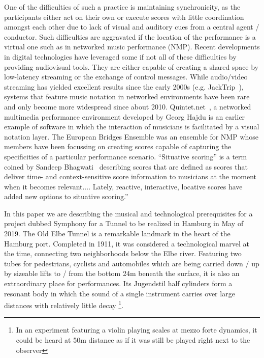 One of the difficulties of such a practice is maintaining synchronicity, as the participants either act on their own or execute scores with little coordination amongst each other due to lack of visual and auditory cues from a central agent / conductor. Such difficulties are aggravated if the location of the performance is a virtual one such as in networked music performance (NMP). Recent developments in digital technologies have leveraged some if not all of these difficulties by providing audiovisual tools. They are either capable of creating a shared space by low-latency streaming or the exchange of control messages. While audio/video streaming has yielded excellent results since the early 2000s  (e.g. JackTrip~\cite{caceres2010jacktrip}), systems that feature music notation in networked environments have been rare and only become more widespread since about 2010. Quintet.net~\cite{hajdu2005quintet}, a networked multimedia performance environment developed by Georg Hajdu is an earlier example of software in which the interaction of musicians is facilitated by a visual notation layer. The European Bridges Ensemble was an ensemble for NMP whose members have been  focussing on creating scores capable of capturing the specificities of a particular performance scenario. ``Situative scoring'' is a term coined by Sandeep Bhagwati~\cite{bhagwati2017vexations} describing scores that are defined as scores that deliver time- and context-sensitive score information to musicians at the moment when it becomes relevant.... Lately, reactive, interactive, locative scores have added new options to situative scoring.''

In this paper we are describing the musical and technological prerequisites for a project dubbed Symphony for a Tunnel to be realized in Hamburg in May of 2019. The Old Elbe Tunnel is a remarkable landmark in the heart of the Hamburg port. Completed in 1911, it was considered a technological marvel at the time, connecting two neighborhoods below the Elbe river. Featuring two tubes for pedestrians, cyclists and automobiles which are being carried down / up by sizeable lifts to / from the bottom 24m beneath the surface, it is also an extraordinary place for performances. Its Jugendstil half cylinders form a resonant body in which the sound of a single instrument carries over large distances with relatively little decay \footnote{In an experiment featuring a violin playing scales at mezzo forte dynamics, it could be heard at 50m distance as if it was still be played right next to the observer}.

